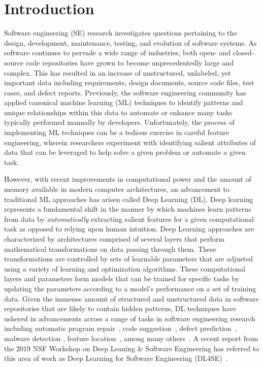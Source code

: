 \chapter{Introduction} %
\label{ch:intro}


Software engineering (SE) research investigates questions pertaining to the design, development, maintenance, testing, and evolution of software systems. As software continues to pervade a wide range of industries, both open- and closed-source code repositories have grown to become unprecedentedly large and complex. This has resulted in an increase of unstructured, unlabeled, yet important data including requirements, design documents, source code files, test cases, and defect reports. Previously, the software engineering community has applied canonical machine learning (ML) techniques to identify patterns and unique relationships within this data to automate or enhance many tasks typically performed manually by developers. Unfortunately, the process of implementing ML techniques can be a tedious exercise in careful feature engineering, wherein researchers experiment with identifying salient attributes of data that can be leveraged to help solve a given problem or automate a given task.

However, with recent improvements in computational power and the amount of memory available in modern computer architectures, an advancement to traditional ML approaches has arisen called Deep Learning (DL). Deep learning represents a fundamental shift in the manner by which machines learn patterns from data by \textit{automatically} extracting salient features for a given computational task as opposed to relying upon human intuition. Deep Learning approaches are characterized by architectures comprised of several layers that perform mathematical transformations on data passing through them. These transformations are controlled by sets of learnable parameters that are adjusted using a variety of learning and optimization algorithms. These computational layers and parameters form models that can be trained for specific tasks by updating the parameters according to a model's performance on a set of training data. Given the immense amount of structured and unstructured data in software repositories that are likely to contain hidden patterns, DL techniques have ushered in advancements across a range of tasks in software engineering research including automatic program repair~\citep{Tufano2018}, code suggestion~\citep{Gu2018}, defect prediction~\citep{Wang2016}, malware detection \cite{Li2018}, feature location~\citep{Corley2015}, among many others~\citep{Ma2018, Wan2018, Liu2018, White2016, Xu2016, Guo2017, Tian2018a, Liu2017}. A recent report from the 2019 NSF Workshop on Deep Leaning \& Software Engineering has referred to this area of work as Deep Learning for Software Engineering (DL4SE)~\citep{dlse19-report}. 

